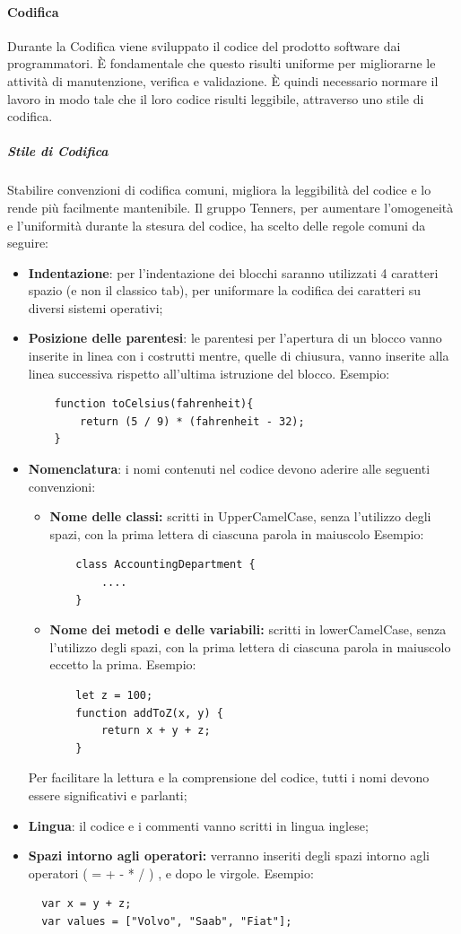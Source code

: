 \paragraph{Codifica}
Durante la Codifica viene sviluppato il codice del prodotto software dai programmatori. È fondamentale che questo risulti uniforme per migliorarne le attività di manutenzione, verifica e validazione. È quindi necessario normare il lavoro in modo tale che il loro codice risulti leggibile, attraverso uno stile di codifica.
\subparagraph*{Stile di Codifica}
Stabilire convenzioni di codifica comuni, migliora la leggibilità del codice e lo rende più facilmente mantenibile. Il gruppo Tenners, per aumentare l'omogeneità e l'uniformità durante la stesura del codice, ha scelto delle regole comuni da seguire:
\begin{itemize}
  \item \textbf{Indentazione}: per l'indentazione dei blocchi saranno utilizzati 4 caratteri spazio (e non il classico tab), per uniformare la codifica dei caratteri su diversi sistemi operativi;
  \item \textbf{Posizione delle parentesi}: le parentesi per l'apertura di un blocco vanno inserite in linea con i costrutti mentre, quelle di chiusura, vanno inserite alla linea successiva rispetto all'ultima istruzione del blocco.
  Esempio:
  \begin{lstlisting}
  	function toCelsius(fahrenheit){
  		return (5 / 9) * (fahrenheit - 32);
  	}
  \end{lstlisting}
  \item \textbf{Nomenclatura}: i nomi contenuti nel codice devono aderire alle seguenti convenzioni:
  \begin{itemize}
  	\item \textbf{Nome delle classi:} scritti in UpperCamelCase, senza l'utilizzo degli spazi, con la prima lettera di ciascuna parola in maiuscolo Esempio:
  	\begin{lstlisting}
  	class AccountingDepartment {
  		....
  	}
  	\end{lstlisting}
  	\item \textbf{Nome dei metodi e delle variabili:} scritti in lowerCamelCase, senza l'utilizzo degli spazi, con la prima lettera di ciascuna parola in maiuscolo eccetto la prima. Esempio:
  	\begin{lstlisting}
  	let z = 100;
  	function addToZ(x, y) {
  		return x + y + z;
  	}
  	\end{lstlisting}
  \end{itemize}
  Per facilitare la lettura e la comprensione del codice, tutti i nomi devono essere significativi e parlanti;
  \item \textbf{Lingua}: il codice e i commenti vanno scritti in lingua inglese;
  \item \textbf{Spazi intorno agli operatori:} verranno inseriti degli spazi intorno agli operatori ( = + - * / ) , e dopo le virgole. 
  Esempio:
  \begin{lstlisting}
  var x = y + z;
  var values = ["Volvo", "Saab", "Fiat"];
  \end{lstlisting}
  
\end{itemize}

